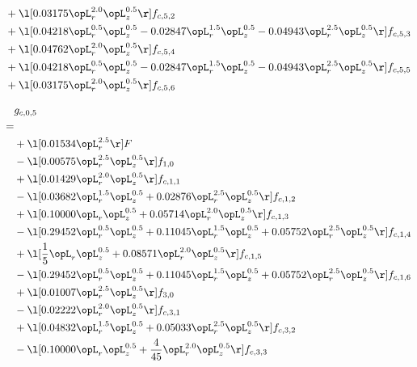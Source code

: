 \begin{alignat}{2}
& + \l[  0.03175 \opL_r^{2.0} \opL_z^{0.5}  \r] f_{c,5,2} \nonumber \\ 
& + \l[  0.04218 \opL_r^{0.5} \opL_z^{0.5}   -0.02847 \opL_r^{1.5} \opL_z^{0.5}   -0.04943 \opL_r^{2.5} \opL_z^{0.5}  \r] f_{c,5,3} \nonumber \\ 
& + \l[  0.04762 \opL_r^{2.0} \opL_z^{0.5}  \r] f_{c,5,4} \nonumber \\ 
& + \l[  0.04218 \opL_r^{0.5} \opL_z^{0.5}   -0.02847 \opL_r^{1.5} \opL_z^{0.5}   -0.04943 \opL_r^{2.5} \opL_z^{0.5}  \r] f_{c,5,5} \nonumber \\ 
& + \l[  0.03175 \opL_r^{2.0} \opL_z^{0.5}  \r] f_{c,5,6} \nonumber \\ 
\end{alignat} 


\begin{alignat}{2} 
\label{eq:g_05_0} 
& g_{c,0,5} \nonumber \\ 
 = \\ 
& + \l[  0.01534 \opL_r^{2.5}  \r] F \nonumber \\ 
& - \l[  0.00575 \opL_r^{2.5} \opL_z^{0.5}  \r] f_{1,0} \nonumber \\ 
& + \l[  0.01429 \opL_r^{2.0} \opL_z^{0.5}  \r] f_{c,1,1} \nonumber \\ 
& - \l[  0.03682 \opL_r^{1.5} \opL_z^{0.5} +  0.02876 \opL_r^{2.5} \opL_z^{0.5}  \r] f_{c,1,2} \nonumber \\ 
& + \l[  0.10000 \opL_r \opL_z^{0.5} +  0.05714 \opL_r^{2.0} \opL_z^{0.5}  \r] f_{c,1,3} \nonumber \\ 
& - \l[  0.29452 \opL_r^{0.5} \opL_z^{0.5} +  0.11045 \opL_r^{1.5} \opL_z^{0.5} +  0.05752 \opL_r^{2.5} \opL_z^{0.5}  \r] f_{c,1,4} \nonumber \\ 
& + \l[ \frac{1}{5} \opL_r \opL_z^{0.5} +  0.08571 \opL_r^{2.0} \opL_z^{0.5}  \r] f_{c,1,5} \nonumber \\ 
& - \l[  0.29452 \opL_r^{0.5} \opL_z^{0.5} +  0.11045 \opL_r^{1.5} \opL_z^{0.5} +  0.05752 \opL_r^{2.5} \opL_z^{0.5}  \r] f_{c,1,6} \nonumber \\ 
& + \l[  0.01007 \opL_r^{2.5} \opL_z^{0.5}  \r] f_{3,0} \nonumber \\ 
& - \l[  0.02222 \opL_r^{2.0} \opL_z^{0.5}  \r] f_{c,3,1} \nonumber \\ 
& + \l[  0.04832 \opL_r^{1.5} \opL_z^{0.5} +  0.05033 \opL_r^{2.5} \opL_z^{0.5}  \r] f_{c,3,2} \nonumber \\ 
& - \l[  0.10000 \opL_r \opL_z^{0.5} + \frac{4}{45} \opL_r^{2.0} \opL_z^{0.5}  \r] f_{c,3,3} \nonumber \\ 

\end{alignat}
